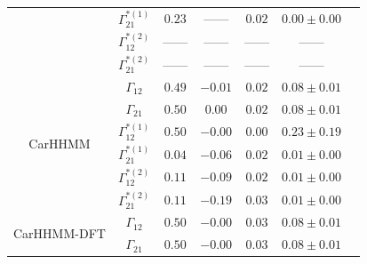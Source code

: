 \documentclass[12pt]{TD-CJS}
\begin{document}
\begin{table}[t]
{\begin{tabular}{ccccccc}
                             & $\Gamma^{*(1)}_{21}$          & $0.23$                         & ------                   & $0.02$                           & $0.00 \pm 0.00$                             \\
                             & $\Gamma^{*(2)}_{12}$          & ------                         & ------                   & ------                           & ------                                      \\
                             & $\Gamma^{*(2)}_{21}$          & ------                         & ------                   & ------                           & ------                                      \\ \hline
\multirow{6}{*}{CarHHMM}     & $\Gamma_{12}$                 & $0.49$                         & $-0.01$                   & $0.02$                           & $0.08 \pm 0.01$                             \\
                             & $\Gamma_{21}$                 & $0.50$                         & $0.00$                   & $0.02$                           & $0.08 \pm 0.01$                             \\
                             & $\Gamma^{*(1)}_{12}$          & $0.50$                         & $-0.00$                   & $0.00$                           & $0.23 \pm 0.19$                             \\
                             & $\Gamma^{*(1)}_{21}$          & $0.04$                         & $-0.06$                   & $0.02$                           & $0.01 \pm 0.00$                             \\
                             & $\Gamma^{*(2)}_{12}$          & $0.11$                         & $-0.09$                   & $0.02$                           & $0.01 \pm 0.00$                             \\
                             & $\Gamma^{*(2)}_{21}$          & $0.11$                         & $-0.19$                   & $0.03$                           & $0.01 \pm 0.00$                             \\ \hline
\multirow{6}{*}{CarHHMM-DFT} & $\Gamma_{12}$                 & $0.50$                         & $-0.00$                   & $0.03$                           & $0.08 \pm 0.01$                             \\
                             & $\Gamma_{21}$                 & $0.50$                         & $-0.00$                   & $0.03$                           & $0.08 \pm 0.01$                             \\

\end{tabular}}
\end{table}
\end{document}
